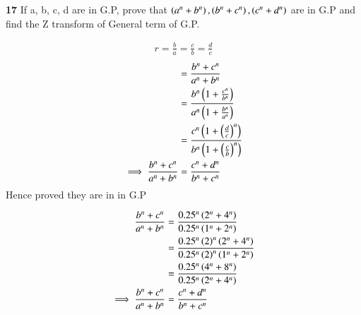 \documentclass[journal,12pt,twocolumn]{IEEEtran}
\theoremstyle{remark}
\begin{document}


\vspace{3cm}

\title{}
\author{EE23BTECH11047 - Deepakreddy P
}
\maketitle
\newpage
\bigskip

\noindent \textbf{17} \quad 
If a, b, c, d are in G.P, prove that 
$ \left(a^{n} + b^{n}\right),\left(b^{n} + c^{n}\right),\left(c^{n} + d^{n}\right) $ are in G.P and find the Z transform of General term of G.P.\\
\solution

\begin{center}
    \begin{table}[ht]
        
    \end{table}
\end{center}

\begin{align}   
r=\frac{b}{a} = \frac{c}{b}= \frac{d}{c}
\end{align}
\begin{align} 
   &= \frac{b^n + c^n }{a^n + b^n}\\
   &= \frac{b^n \left(1 + \frac{c^n}{b^n} \right) }{a^n \left(1 + \frac{b^n}{a^n}\right)}\\
   &= \frac{c^n \left(1 + \left(\frac{d}{c}\right)^n \right)}{b^n \left(1 + \left(\frac{c}{b}\right)^n \right)}\\
\implies \frac{b^n + c^n }{a^n + b^n} &= \frac{c^n + d^n}{b^n + c^n}
\end{align}
Hence proved they are in in G.P

\bigskip  
\begin{center}
    \begin{table}[ht]
        
    \end{table}
\end{center}

\begin{align}
\frac{b^n + c^n}{a^n + b^n} &= \frac{0.25^n \left(2^n + 4^n\right)}{0.25^n \left(1^n + 2^n\right)}\\
&= \frac{0.25^n  \left(2\right)^n \left(2^n + 4^n\right)}{0.25^n \left(2\right)^n \left(1^n + 2^n\right)}\\
&= \frac{0.25^n \left(4^n + 8^n\right)}{0.25^n \left(2^n + 4^n\right)}\\
\implies \frac{b^n + c^n }{a^n + b^n} &= \frac{c^n + d^n}{b^n + c^n}
\end{align}
\end{document}
